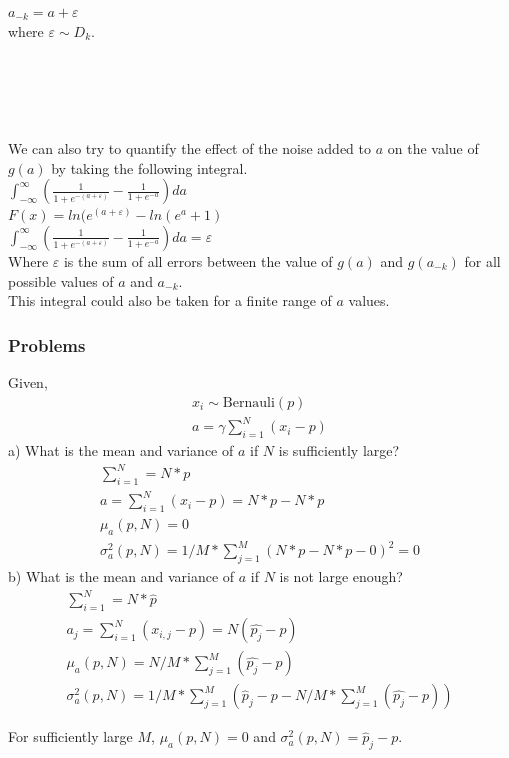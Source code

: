 \documentclass{article}
\begin{document}
$a_{-k}=a+\varepsilon$\\
where $\varepsilon \sim D_k$.\\\\\\\\\\\\
We can also try to quantify the effect of the noise added to $a$ on the value of $g(a)$ by taking the following integral.
\\
$\int_{-\infty}^{\infty}(\frac{1}{1+e^{-(a+\varepsilon)}}-\frac{1}{1+e^{-a}}) da$
\\
$F(x) = ln(e^{(a+\varepsilon)}-ln(e^{a}+1)$
\\
$\int_{-\infty}^{\infty}(\frac{1}{1+e^{-(a+\varepsilon)}}-\frac{1}{1+e^{-a}}) da=\varepsilon$\\
Where $\varepsilon$ is the sum of all errors between the value of $g(a)$ and $g(a_{-k})$ for all possible values of $a$ and $a_{-k}$.\\
This integral could also be taken for a finite range of $a$ values.\\
\subsubsection*{Problems}


Given,
\begin{align}
x_i \sim \mathrm{Bernauli}(p) \\
a = \gamma \sum_{i=1}^N (x_i-p)
\end{align}
a) What is the mean and variance of $a$ if $N$ is sufficiently large?
\begin{align}
\sum_{i=1}^N = N*p\\
a = \sum_{i=1}^N (x_i - p) = N*p - N*p\\
\mu_a (p, N) = 0\\
\sigma_a^2 (p, N) = 1/M * \sum_{j=1}^M (N*p-N*p-0)^2=0
\end{align}
b) What is the mean and variance of $a$ if $N$ is not large enough?
\begin{align}
    \sum_{i=1}^N = N*\hat{p}\\
    a_j = \sum_{i=1}^N (x_{i,j} - p) = N(\hat{p_j} - p)\\
    \mu_a (p, N) = N/M * \sum_{j=1}^M (\hat{p_j}-p)\\
    \sigma_a^2 (p, N) = 1/M * \sum_{j=1}^M (\hat{p}_j-p- N/M * \sum_{j=1}^M (\hat{p_j}-p))
\end{align}

For sufficiently large $M$, $\mu_a (p, N) = 0$ and $\sigma_a^2 (p, N) = \hat{p}_j-p$.
\end{document}
